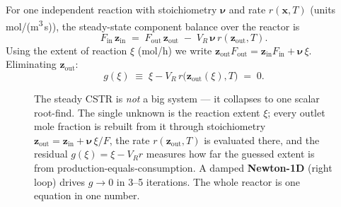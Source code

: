 \documentclass[11pt,a4paper]{article}
\newcommand{\xv}{\mathbf{x}}
\newcommand{\zv}{\mathbf{z}}
\begin{document}
For one independent reaction with stoichiometry $\boldsymbol\nu$ and
rate $r(\xv, T)$ (units mol/(m\textsuperscript{3}\,s)), the steady-state
component balance over the reactor is
\begin{equation}
   F_{\mathrm{in}}\,\zv_{\mathrm{in}}
   \;=\; F_{\mathrm{out}}\,\zv_{\mathrm{out}}
   \;-\; V_R \, \boldsymbol\nu \, r(\zv_{\mathrm{out}}, T).
\end{equation}
Using the extent of reaction $\xi$ (mol/h) we write
$\zv_{\mathrm{out}} F_{\mathrm{out}} = \zv_{\mathrm{in}} F_{\mathrm{in}}
 + \boldsymbol\nu \, \xi$. Eliminating $\zv_{\mathrm{out}}$:
\begin{equation}
   g(\xi) \;\equiv\; \xi - V_R\,r\bigl(\zv_{\mathrm{out}}(\xi), T\bigr) \;=\; 0.
   \label{eq:cstr}
\end{equation}

\begin{figure}[ht]
\centering
{}
\caption{The steady CSTR is \emph{not} a big system --- it collapses to
one scalar root-find.  The single unknown is the reaction extent $\xi$;
every outlet mole fraction is rebuilt from it through stoichiometry
$\zv_{\text{out}}=\zv_{\text{in}}+\boldsymbol\nu\,\xi/F$, the rate
$r(\zv_{\text{out}},T)$ is evaluated there, and the residual
$g(\xi)=\xi-V_R r$ measures how far the guessed extent is from
production-equals-consumption.  A damped \textbf{Newton-1D} (right
loop) drives $g\to0$ in 3--5 iterations.  The whole reactor is one
equation in one number.}
\label{fig:cstr-newton-loop}
\end{figure}
\end{document}
